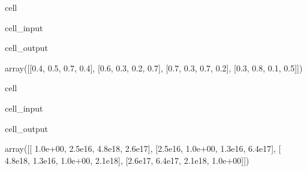 \documentclass[letterpaper,10pt,english]{jupyterBook}
\begin{document}
\begin{sphinxuseclass}{cell}\begin{sphinxVerbatimInput}

\begin{sphinxuseclass}{cell_input}
\begin{sphinxVerbatim}[commandchars=\\\{\}]
\end{sphinxVerbatim}

\end{sphinxuseclass}\end{sphinxVerbatimInput}
\begin{sphinxVerbatimOutput}

\begin{sphinxuseclass}{cell_output}
\begin{sphinxVerbatim}[commandchars=\\\{\}]
array([[\PYGZhy{}0.4,  0.5, \PYGZhy{}0.7,  0.4],
       [\PYGZhy{}0.6, \PYGZhy{}0.3, \PYGZhy{}0.2, \PYGZhy{}0.7],
       [\PYGZhy{}0.7,  0.3,  0.7,  0.2],
       [\PYGZhy{}0.3, \PYGZhy{}0.8, \PYGZhy{}0.1,  0.5]])
\end{sphinxVerbatim}

\end{sphinxuseclass}\end{sphinxVerbatimOutput}

\end{sphinxuseclass}
\begin{sphinxuseclass}{cell}\begin{sphinxVerbatimInput}

\begin{sphinxuseclass}{cell_input}
\begin{sphinxVerbatim}[commandchars=\\\{\}]
\end{sphinxVerbatim}

\end{sphinxuseclass}\end{sphinxVerbatimInput}
\begin{sphinxVerbatimOutput}

\begin{sphinxuseclass}{cell_output}
\begin{sphinxVerbatim}[commandchars=\\\{\}]
array([[ 1.0e+00, \PYGZhy{}2.5e\PYGZhy{}16,  4.8e\PYGZhy{}18, \PYGZhy{}2.6e\PYGZhy{}17],
       [\PYGZhy{}2.5e\PYGZhy{}16,  1.0e+00, \PYGZhy{}1.3e\PYGZhy{}16,  6.4e\PYGZhy{}17],
       [ 4.8e\PYGZhy{}18, \PYGZhy{}1.3e\PYGZhy{}16,  1.0e+00, \PYGZhy{}2.1e\PYGZhy{}18],
       [\PYGZhy{}2.6e\PYGZhy{}17,  6.4e\PYGZhy{}17, \PYGZhy{}2.1e\PYGZhy{}18,  1.0e+00]])
\end{sphinxVerbatim}

\end{sphinxuseclass}\end{sphinxVerbatimOutput}

\end{sphinxuseclass}
\end{document}
